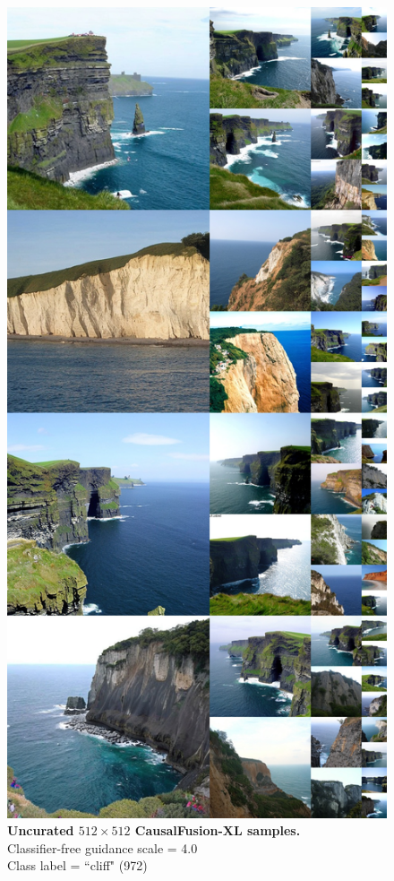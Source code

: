 \begin{figure}\centering
\includegraphics[width=\linewidth]{figs/xl512_972_cfg4.0.jpg}
\caption{\textbf{Uncurated $512\times512$ CausalFusion-XL samples.} \\Classifier-free guidance scale = 4.0\\Class label = ``cliff" (972)}\vspace{-2mm}
\label{fig:samples512_4}
\end{figure}

